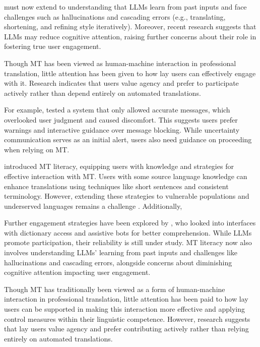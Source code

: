must now extend to understanding that LLMs learn from past inputs and face challenges such as hallucinations and cascading errors (e.g., translating, shortening, and refining style iteratively). Moreover, recent research suggests that LLMs may reduce cognitive attention, raising further concerns about their role in fostering true user engagement.




Though MT has been viewed as human-machine interaction in professional translation, little attention has been given to how lay users can effectively engage with it. Research indicates that users value agency and prefer to participate actively rather than depend entirely on automated translations.

For example,  tested a system that only allowed accurate messages, which overlooked user judgment and caused discomfort. This suggests users prefer warnings and interactive guidance over message blocking. While uncertainty communication serves as an initial alert, users also need guidance on proceeding when relying on MT.

\citet{bowker2019towards} introduced MT literacy, equipping users with knowledge and strategies for effective interaction with MT. Users with some source language knowledge can enhance translations using techniques like short sentences and consistent terminology. However, extending these strategies to vulnerable populations and underserved languages remains a challenge \citep{Liebling}.
Additionally,   

Further engagement strategies have been explored by , who looked into interfaces with dictionary access and assistive bots for better comprehension. While LLMs promote participation, their reliability is still under study. MT literacy now also involves understanding LLMs' learning from past inputs and challenges like hallucinations and cascading errors, alongside concerns about diminishing cognitive attention impacting user engagement.







Though MT has traditionally been viewed as a form of human-machine interaction in professional translation, little attention has been paid to how lay users can be supported in making this interaction more effective and applying control measures within their linguistic competence. However, research suggests that lay users value agency and prefer contributing actively rather than relying entirely on automated translations.

